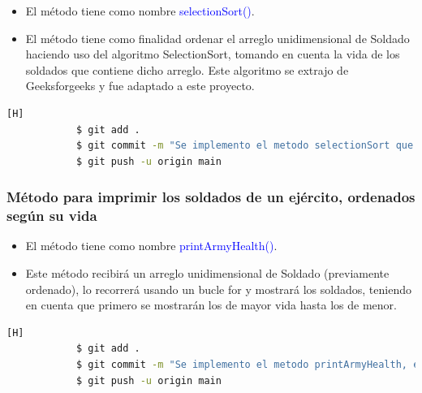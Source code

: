 \documentclass{article}
\begin{document}
        \begin{itemize}
            \item El método tiene como nombre \textcolor{blue}{selectionSort()}.
            \item El método tiene como finalidad ordenar el arreglo unidimensional de Soldado haciendo uso del algoritmo SelectionSort, tomando en cuenta la vida de los soldados que contiene dicho arreglo. Este algoritmo se extrajo de Geeksforgeeks y fue adaptado a este proyecto.
        \end{itemize}

        

        \begin{lstlisting}[language=bash,caption={Commit: Se implementó el método selectionSort}][H]
    		$ git add .
    		$ git commit -m "Se implemento el metodo selectionSort que realizara el mismo ordenamiento que los dos metodos anteriormente creados, pero usando el algoritmo de selection sort"			
    		$ git push -u origin main
    	\end{lstlisting}
        
        \newpage
        \subsubsection{Método para imprimir los soldados de un ejército, ordenados según su vida}
        
        \begin{itemize}
            \item El método tiene como nombre \textcolor{blue}{printArmyHealth()}.
            \item Este método recibirá un arreglo unidimensional de Soldado (previamente ordenado), lo recorrerá usando un bucle for y mostrará los soldados, teniendo en cuenta que primero se mostrarán los de mayor vida hasta los de menor.
        \end{itemize}
        
        

        \begin{lstlisting}[language=bash,caption={Commit: Se implementaró el método showArmyHealth}][H]
    		$ git add .
    		$ git commit -m "Se implemento el metodo printArmyHealth, este nos mostrara el ejercito ordenado segun la vida, sera usado luego de aplicarle los algoritmos de ordenamiento a nuestro ejercito"	
    		$ git push -u origin main
    	\end{lstlisting}
\end{document}
